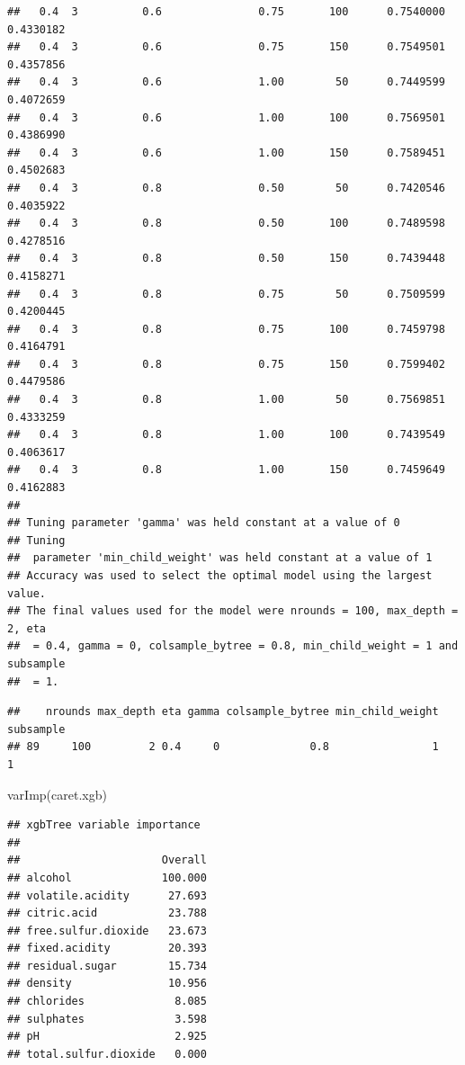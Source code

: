 \documentclass[
  spanish,
]{book}
\newenvironment{Shaded}{\begin{snugshade}}{\end{snugshade}}
\newcommand{\FunctionTok}[1]{\textcolor[rgb]{0.00,0.00,0.00}{#1}}
\newcommand{\NormalTok}[1]{#1}
\newcommand{\SpecialCharTok}[1]{\textcolor[rgb]{0.00,0.00,0.00}{#1}}
\theoremstyle{break}
\theoremstyle{definition}
\theoremstyle{definition}
\theoremstyle{definition}
\theoremstyle{definition}
\theoremstyle{remark}
\begin{document}
\begin{verbatim}
##   0.4  3          0.6               0.75       100      0.7540000  0.4330182
##   0.4  3          0.6               0.75       150      0.7549501  0.4357856
##   0.4  3          0.6               1.00        50      0.7449599  0.4072659
##   0.4  3          0.6               1.00       100      0.7569501  0.4386990
##   0.4  3          0.6               1.00       150      0.7589451  0.4502683
##   0.4  3          0.8               0.50        50      0.7420546  0.4035922
##   0.4  3          0.8               0.50       100      0.7489598  0.4278516
##   0.4  3          0.8               0.50       150      0.7439448  0.4158271
##   0.4  3          0.8               0.75        50      0.7509599  0.4200445
##   0.4  3          0.8               0.75       100      0.7459798  0.4164791
##   0.4  3          0.8               0.75       150      0.7599402  0.4479586
##   0.4  3          0.8               1.00        50      0.7569851  0.4333259
##   0.4  3          0.8               1.00       100      0.7439549  0.4063617
##   0.4  3          0.8               1.00       150      0.7459649  0.4162883
## 
## Tuning parameter 'gamma' was held constant at a value of 0
## Tuning
##  parameter 'min_child_weight' was held constant at a value of 1
## Accuracy was used to select the optimal model using the largest value.
## The final values used for the model were nrounds = 100, max_depth = 2, eta
##  = 0.4, gamma = 0, colsample_bytree = 0.8, min_child_weight = 1 and subsample
##  = 1.
\end{verbatim}

\begin{Shaded}
\end{Shaded}

\begin{verbatim}
##    nrounds max_depth eta gamma colsample_bytree min_child_weight subsample
## 89     100         2 0.4     0              0.8                1         1
\end{verbatim}

\begin{Shaded}
\begin{Highlighting}[]
\FunctionTok{varImp}\NormalTok{(caret.xgb)}
\end{Highlighting}
\end{Shaded}

\begin{verbatim}
## xgbTree variable importance
## 
##                      Overall
## alcohol              100.000
## volatile.acidity      27.693
## citric.acid           23.788
## free.sulfur.dioxide   23.673
## fixed.acidity         20.393
## residual.sugar        15.734
## density               10.956
## chlorides              8.085
## sulphates              3.598
## pH                     2.925
## total.sulfur.dioxide   0.000
\end{verbatim}
\end{document}
